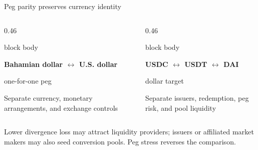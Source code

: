 \begin{frame}{Peg parity preserves currency identity}
\begin{columns}[T,totalwidth=0.96\textwidth]
\begin{column}{0.46\textwidth}
\begin{beamercolorbox}[rounded=true,sep=0.22cm]{block body}
\centering
{\large\bfseries Bahamian dollar $\longleftrightarrow$ U.S. dollar\par}
\vspace{0.16cm}
{\small one-for-one peg\par}
\vspace{0.22cm}
{\small Separate currency, monetary arrangements, and exchange controls\par}
\end{beamercolorbox}
\end{column}
\begin{column}{0.46\textwidth}
\begin{beamercolorbox}[rounded=true,sep=0.22cm]{block body}
\centering
{\large\bfseries USDC $\longleftrightarrow$ USDT $\longleftrightarrow$ DAI\par}
\vspace{0.16cm}
{\small dollar target\par}
\vspace{0.22cm}
{\small Separate issuers, redemption, peg risk, and pool liquidity\par}
\end{beamercolorbox}
\end{column}
\end{columns}
\vspace{0.44cm}
\begin{center}
\begin{minipage}{0.90\textwidth}
\centering
{\small Lower divergence loss may attract liquidity providers; issuers or affiliated market makers may also seed conversion pools. Peg stress reverses the comparison.\par}
\end{minipage}
\end{center}
\end{frame}

